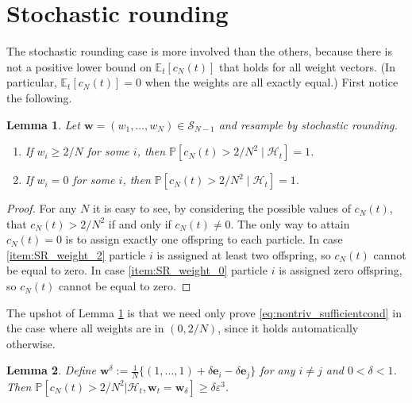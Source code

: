 \documentclass{article}
\newtheorem{lemma}{Lemma}
\newcommand{\Prob}{\mathbb{P}}
\newcommand{\Et}{\mathbb{E}_t}
\newcommand{\1}[1]{\mathbb{I}_{#1}}
\begin{document}
\section*{Stochastic rounding}

The stochastic rounding case is more involved than the others, because there is not a positive lower bound on $\Et[c_N(t)]$ that holds for all weight vectors. (In particular, $\Et[c_N(t)]=0$ when the weights are all exactly equal.)
First notice the following.

\begin{lemma} \label{lem:extreme_w_coal_as}
Let $\mathbf{w} = (w_1,\dots,w_N) \in \mathcal{S}_{N-1}$ and resample by stochastic rounding.
\begin{enumerate}[label=(\roman*)]
\item If $w_i \geq 2/N$ for some $i$, then $\Prob[c_N(t) > 2/N^2 \mid \mathcal{H}_t ] =1$. \label{item:SR_weight_2}
\item If $w_i= 0$ for some $i$, then $\Prob[c_N(t) > 2/N^2 \mid \mathcal{H}_t ] =1$. \label{item:SR_weight_0}
\end{enumerate}
\end{lemma}

\begin{proof}
For any $N$ it is easy to see, by considering the possible values of $c_N(t)$, that $c_N(t) > 2/N^2$ if and only if $c_N(t) \neq 0$. The only way to attain $c_N(t) = 0$ is to assign exactly one offspring to each particle.
In case \ref{item:SR_weight_2} particle $i$ is assigned at least two offspring, so $c_N(t)$ cannot be equal to zero.
In case \ref{item:SR_weight_0} particle $i$ is assigned zero offspring, so $c_N(t)$ cannot be equal to zero.
\end{proof}

The upshot of Lemma \ref{lem:extreme_w_coal_as} is that we need only prove \eqref{eq:nontriv_sufficientcond} in the case where all weights are in $(0, 2/N)$, since it holds automatically otherwise.

\begin{lemma}\label{lem:weps_cN_prob}
Define $\mathbf{w}^\delta := \frac{1}{N}\{(1,\dots,1) + \delta \mathbf{e}_i - \delta \mathbf{e}_j \}$ for any $i \neq j$ and $0< \delta < 1$. Then $\Prob[c_N(t) > 2/N^2 | \mathcal{H}_t, \mathbf{w}_t = \mathbf{w}_\delta] \geq \delta \varepsilon^3$.
\end{lemma}
\end{document}
